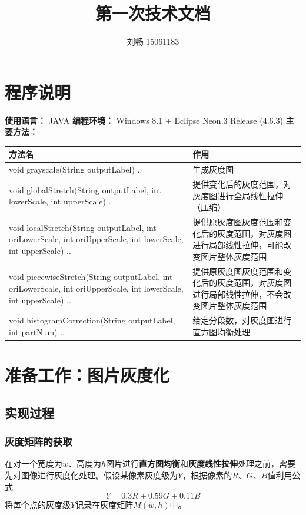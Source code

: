 \documentclass[UTF8]{ctexart}
\title{第一次技术文档}
\author{刘畅 15061183}
\begin{document}
	\maketitle
	\section{程序说明}
	\noindent
	\textbf{使用语言：} JAVA \newline
	\textbf{编程环境：} Windows 8.1 + Eclipse Neon.3 Release (4.6.3) \newline
	\textbf{主要方法：} \newline
	\begin{tabular}{p{10cm}p{7cm}}
	\hline
	\textbf{方法名}& \textbf{作用} \\
	\hline
	void grayscale(String outputLabel) {..}&  生成灰度图\\
	\hline
	void globalStretch(String outputLabel, int lowerScale, int upperScale) {..}&  提供变化后的灰度范围，对灰度图进行全局线性拉伸（压缩）\\
	\hline
	void localStretch(String outputLabel, int oriLowerScale, int oriUpperScale, int lowerScale, int upperScale) {..}&  提供原灰度图灰度范围和变化后的灰度范围，对灰度图进行局部线性拉伸，可能改变图片整体灰度范围\\
	\hline
	void piecewiseStretch(String outputLabel, int oriLowerScale, int oriUpperScale, int lowerScale, int upperScale) {..}& 提供原灰度图灰度范围和变化后的灰度范围，对灰度图进行局部线性拉伸，不会改变图片整体灰度范围 \\
	\hline
	void histogramCorrection(String outputLabel, int partNum) {..}&  给定分段数，对灰度图进行直方图均衡处理\\
	\hline
	\end{tabular}

	\section{准备工作：图片灰度化}
		\subsection{实现过程}
			\subsubsection{灰度矩阵的获取}
			在对一个宽度为$w$、高度为$h$图片进行\textbf{直方图均衡}和\textbf{灰度线性拉伸}处理之前，需要先对图像进行灰度化处理。假设某像素灰度级为$Y$，根据像素的$R$、$G$、$B$值利用公式
			\[ Y=0.3R+0.59G+0.11B \]
			将每个点的灰度级$Y$记录在灰度矩阵$M(w,h)$中。
\end{document}
